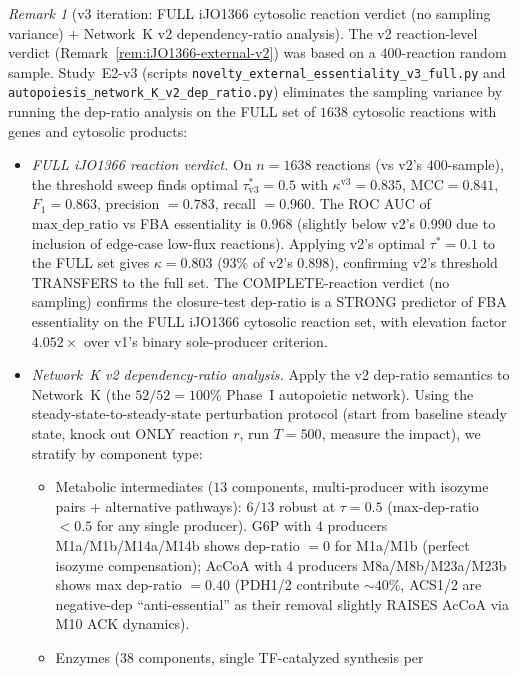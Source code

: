 \documentclass[11pt,a4paper]{article}
\theoremstyle{plain}
\theoremstyle{definition}
\theoremstyle{remark}
\newtheorem{remark}[theorem]{Remark}
\begin{document}
\begin{remark}[v3 iteration: FULL iJO1366 cytosolic reaction verdict
(no sampling variance) + Network~K v2 dependency-ratio analysis]
\label{rem:iJO1366-external-v3}
The v2 reaction-level verdict (Remark~\ref{rem:iJO1366-external-v2})
was based on a $400$-reaction random sample. Study~E2-v3 (scripts
\texttt{novelty\_external\_essentiality\_v3\_full.py} and
\texttt{autopoiesis\_network\_K\_v2\_dep\_ratio.py}) eliminates the
sampling variance by running the dep-ratio analysis on the FULL set of
$1638$ cytosolic reactions with genes and cytosolic products:
\begin{itemize}
\item[(i)] \emph{FULL iJO1366 reaction verdict.} On $n = 1638$ reactions
  (vs v2's $400$-sample), the threshold sweep finds optimal
  $\tau^{*}_{\mathrm{v3}} = 0.5$ with
  $\kappa^{\mathrm{v3}} = 0.835$, $\mathrm{MCC} = 0.841$,
  $F_1 = 0.863$, precision $= 0.783$, recall $= 0.960$.
  The ROC AUC of $\mathrm{max\_dep\_ratio}$ vs FBA essentiality is
  $\mathbf{0.968}$ (slightly below v2's $0.990$ due to inclusion of
  edge-case low-flux reactions). Applying v2's optimal $\tau^{*} = 0.1$
  to the FULL set gives $\kappa = 0.803$ ($93\%$ of v2's $0.898$),
  confirming v2's threshold TRANSFERS to the full set. The
  COMPLETE-reaction verdict (no sampling) confirms the closure-test
  dep-ratio is a STRONG predictor of FBA essentiality on the FULL
  iJO1366 cytosolic reaction set, with elevation factor $4.052\times$
  over v1's binary sole-producer criterion.
\item[(ii)] \emph{Network~K v2 dependency-ratio analysis.} Apply the
  v2 dep-ratio semantics to Network~K (the $52/52 = 100\%$ Phase~I
  autopoietic network). Using the steady-state-to-steady-state
  perturbation protocol (start from baseline steady state, knock out
  ONLY reaction $r$, run $T = 500$, measure the impact), we stratify
  by component type:
  \begin{itemize}
  \item Metabolic intermediates ($13$ components, multi-producer with
    isozyme pairs + alternative pathways): $6/13$ robust at $\tau = 0.5$
    (max-dep-ratio $< 0.5$ for any single producer). G6P with $4$
    producers M1a/M1b/M14a/M14b shows dep-ratio $= 0$ for M1a/M1b
    (perfect isozyme compensation); AcCoA with $4$ producers
    M8a/M8b/M23a/M23b shows max dep-ratio $= 0.40$ (PDH1/2 contribute
    $\sim 40\%$, ACS1/2 are negative-dep ``anti-essential'' as their
    removal slightly RAISES AcCoA via M10 ACK dynamics).
  \item Enzymes ($38$ components, single TF-catalyzed synthesis per

\end{itemize}
\end{itemize}
\end{remark}
\end{document}
